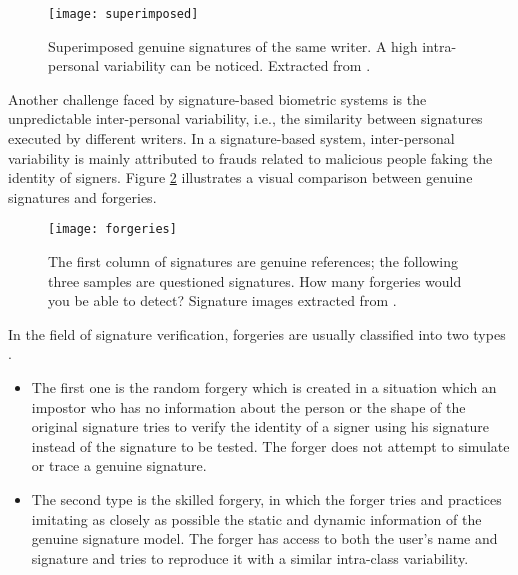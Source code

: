 \begin{figure}[!h]
\centering
\texttt{[image: superimposed]}
\caption{Superimposed genuine signatures of the same writer. A high intra-personal variability can be noticed. Extracted from \cite{hafemann2015offline}. }
\label{fig:intraclass}
\end{figure}


Another challenge faced by signature-based biometric systems is the unpredictable inter-personal variability, i.e., the similarity between signatures executed by different writers. In a signature-based system, inter-personal variability is mainly attributed to frauds related to malicious people faking the identity of signers. Figure \ref{fig_forgeries} illustrates a visual comparison between genuine signatures and forgeries. 

\begin{figure}[!htb]
\centering
\texttt{[image: forgeries]}
\caption[The first column of signatures are genuine references, the following three samples are questioned signatures. How many forgeries would you be able to detect? Signature images extracted from \cite{mcyt-100}.]{The first column of signatures are genuine references; the following three samples are questioned signatures. How many forgeries would you be able to detect? \protect\footnotemark Signature images extracted from \cite{mcyt-100}.} 
\label{fig_forgeries}

\end{figure}


In the field of signature verification, forgeries are usually classified into two types \cite{impedovo2008state}. 
\begin{itemize}
\item The first one is the random forgery which is created in a situation which an impostor who has no information about the person or the shape of the original signature tries to verify the identity of a signer using his signature instead of the signature to be tested. The forger does not attempt to simulate or trace a genuine signature.

\item The second type is the skilled forgery, in which the forger tries and practices imitating as closely as possible the static and dynamic information of the genuine signature model. The forger has access to both the user’s name and signature and tries to reproduce it with a similar intra-class variability.
\end{itemize}



